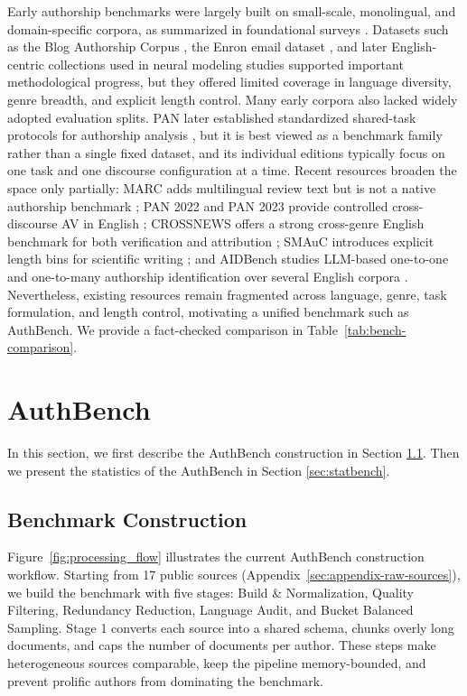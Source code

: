 \documentclass{article}
\newcommand{\rev}[1]{#1}
\begin{document}
\rev{Early authorship benchmarks were largely built on small-scale, monolingual, and domain-specific corpora, as summarized in foundational surveys \citep{stamatatos2009survey, neal2017surveying}. Datasets such as the Blog Authorship Corpus \citep{schler2006effects}, the Enron email dataset \citep{klimt2004enron}, and later English-centric collections used in neural modeling studies \citep{ruder2016character, jafariakinabad2019styleaware} supported important methodological progress, but they offered limited coverage in language diversity, genre breadth, and explicit length control. Many early corpora also lacked widely adopted evaluation splits. PAN later established standardized shared-task protocols for authorship analysis \citep{potthast2016whowrote,bevendorff2020pan}, but it is best viewed as a benchmark family rather than a single fixed dataset, and its individual editions typically focus on one task and one discourse configuration at a time. Recent resources broaden the space only partially: MARC adds multilingual review text but is not a native authorship benchmark \citep{keung2020marc}; PAN 2022 and PAN 2023 provide controlled cross-discourse AV in English \citep{pan2022av,pan2023av}; CROSSNEWS offers a strong cross-genre English benchmark for both verification and attribution \citep{ma2025crossnews}; SMAuC introduces explicit length bins for scientific writing \citep{bevendorff2023smauc}; and AIDBench studies LLM-based one-to-one and one-to-many authorship identification over several English corpora \citep{wen2024aidbench}. Nevertheless, existing resources remain fragmented across language, genre, task formulation, and length control, motivating a unified benchmark such as AuthBench. We provide a fact-checked comparison in Table~\ref{tab:bench-comparison}.}

\section{AuthBench}
\label{sec:overview}
In this section, we first describe the AuthBench construction in Section \ref{sec:construction}. Then we present the statistics of the AuthBench in Section \ref{sec:statbench}.
\subsection{Benchmark Construction}
\label{sec:construction}
\rev{Figure~\ref{fig:processing_flow} illustrates the current AuthBench construction workflow. Starting from 17 public sources (Appendix~\ref{sec:appendix-raw-sources}), we build the benchmark with five stages: Build \& Normalization, Quality Filtering, Redundancy Reduction, Language Audit, and Bucket Balanced Sampling. Stage 1 converts each source into a shared schema, chunks overly long documents, and caps the number of documents per author. These steps make heterogeneous sources comparable, keep the pipeline memory-bounded, and prevent prolific authors from dominating the benchmark.}
\end{document}
